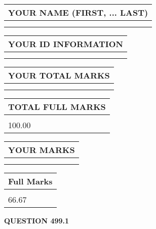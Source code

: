 \documentclass{ctexart}
\begin{document}
   
   
   
\newpage 
\setcounter{page}{ 
   499001 } 
   
   
   
   
\noindent\begin{tabular}{|l|}
\hline
YOUR NAME (FIRST, ... LAST)  \\
\hline
 \\ 
 \\ 
\hline
\end{tabular}
\hspace{0.05in} \begin{tabular}{|l|}
\hline
 YOUR   ID   INFORMATION  \\
\hline
 \\ 
 \\ 
\hline
\end{tabular}
   
   
\vspace{0.2in}\noindent\begin{tabular}{|l|}
\hline
YOUR TOTAL MARKS  \\
\hline
 \\ 
 \\ 
\hline
\end{tabular}
\hspace{0.05in} \begin{tabular}{|l|}
\hline
TOTAL FULL MARKS  \\
\hline
 \\ 
100.00 \\
\hline
\end{tabular}
   
   
 \vspace{0.2in}
 
 
 
 
   
   
  
\vspace{0.2in}
  
\noindent\begin{tabular}{|l|}
\hline
 YOUR MARKS  \\
\hline
 \\ 
 \\ 
\hline
\end{tabular}
\hspace{0.05in} \begin{tabular}{|l|}
\hline
 Full Marks  \\
\hline
 \\ 
66.67 \\
\hline
\end{tabular}
{\textbf{\Large{QUESTION
499.1 
}}}
  
\end{document}
